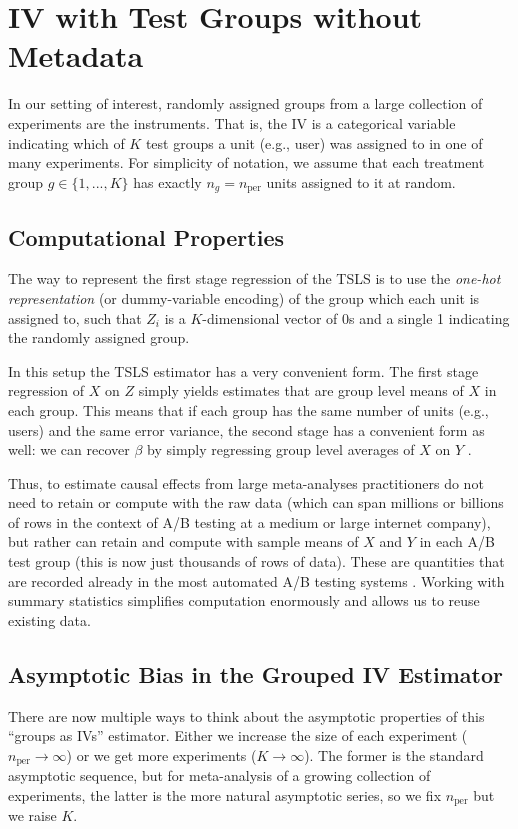 \documentclass{article}
\newcommand\nper{{n_{\text{per}}}}
\begin{document}
\section{IV with Test Groups without Metadata}
In our setting of interest, randomly assigned groups from a large collection of experiments are the instruments. That is, the IV is a categorical variable indicating which of $K$ test groups a unit (e.g., user) was assigned to in one of many experiments. For simplicity of notation, we assume that each treatment group $g \in \{1, ..., K \}$ has exactly $n_g = \nper$ units assigned to it at random.

\subsection{Computational Properties}
The way to represent the first stage regression of the TSLS is to use the \emph{one-hot representation} (or dummy-variable encoding) of the group which each unit is assigned to, such that $Z_i$ is a $K$-dimensional vector of 0s and a single 1 indicating the randomly assigned group.

In this setup the TSLS estimator has a very convenient form. The first stage regression of $X$ on $Z$ simply yields estimates that are group level means of $X$ in each group. This means that if each group has the same number of units (e.g., users) and the same error variance, the second stage has a convenient form as well: we can recover $\beta$ by simply regressing group level averages of $X$ on $Y$ \citep[section 4.1.3]{angrist2008mostly}.

Thus, to estimate causal effects from large meta-analyses practitioners do not need to retain or compute with the raw data (which can span millions or billions of rows in the context of A/B testing at a medium or large internet company), but rather can retain and compute with sample means of $X$ and $Y$ in each A/B test group (this is now just thousands of rows of data). These are quantities that are recorded already in the most automated A/B testing systems \citep{bakshy2014www, xu2015infrastructure}. Working with summary statistics simplifies computation enormously and allows us to reuse existing data.

\subsection{Asymptotic Bias in the Grouped IV Estimator}
There are now multiple ways to think about the asymptotic properties of this ``groups as IVs'' estimator. Either we increase the size of each experiment ($\nper \rightarrow \infty$) or we get more experiments ($K \rightarrow \infty$). The former is the standard asymptotic sequence, but for meta-analysis of a growing collection of experiments, the latter is the more natural asymptotic series, so we fix $\nper$ but we raise $K$.
\end{document}
